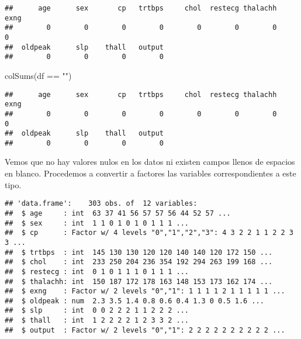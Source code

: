 \documentclass[
]{article}
\newenvironment{Shaded}{\begin{snugshade}}{\end{snugshade}}
\newcommand{\FunctionTok}[1]{\textcolor[rgb]{0.94,0.94,0.56}{#1}}
\newcommand{\NormalTok}[1]{\textcolor[rgb]{0.80,0.80,0.80}{#1}}
\newcommand{\OtherTok}[1]{\textcolor[rgb]{0.94,0.94,0.56}{#1}}
\newcommand{\SpecialCharTok}[1]{\textcolor[rgb]{0.86,0.64,0.64}{#1}}
\newcommand{\StringTok}[1]{\textcolor[rgb]{0.80,0.58,0.58}{#1}}
\begin{document}
\begin{verbatim}
##      age      sex       cp   trtbps     chol  restecg thalachh     exng 
##        0        0        0        0        0        0        0        0 
##  oldpeak      slp    thall   output 
##        0        0        0        0
\end{verbatim}

\begin{Shaded}
\begin{Highlighting}[]
\FunctionTok{colSums}\NormalTok{(df }\SpecialCharTok{==} \StringTok{""}\NormalTok{)}
\end{Highlighting}
\end{Shaded}

\begin{verbatim}
##      age      sex       cp   trtbps     chol  restecg thalachh     exng 
##        0        0        0        0        0        0        0        0 
##  oldpeak      slp    thall   output 
##        0        0        0        0
\end{verbatim}

Vemos que no hay valores nulos en los datos ni existen campos llenos de
espacios en blanco. Procedemos a convertir a factores las variables
correspondientes a este tipo.

\begin{Shaded}
\end{Shaded}

\begin{verbatim}
## 'data.frame':    303 obs. of  12 variables:
##  $ age     : int  63 37 41 56 57 57 56 44 52 57 ...
##  $ sex     : int  1 1 0 1 0 1 0 1 1 1 ...
##  $ cp      : Factor w/ 4 levels "0","1","2","3": 4 3 2 2 1 1 2 2 3 3 ...
##  $ trtbps  : int  145 130 130 120 120 140 140 120 172 150 ...
##  $ chol    : int  233 250 204 236 354 192 294 263 199 168 ...
##  $ restecg : int  0 1 0 1 1 1 0 1 1 1 ...
##  $ thalachh: int  150 187 172 178 163 148 153 173 162 174 ...
##  $ exng    : Factor w/ 2 levels "0","1": 1 1 1 1 2 1 1 1 1 1 ...
##  $ oldpeak : num  2.3 3.5 1.4 0.8 0.6 0.4 1.3 0 0.5 1.6 ...
##  $ slp     : int  0 0 2 2 2 1 1 2 2 2 ...
##  $ thall   : int  1 2 2 2 2 1 2 3 3 2 ...
##  $ output  : Factor w/ 2 levels "0","1": 2 2 2 2 2 2 2 2 2 2 ...
\end{verbatim}
\end{document}
